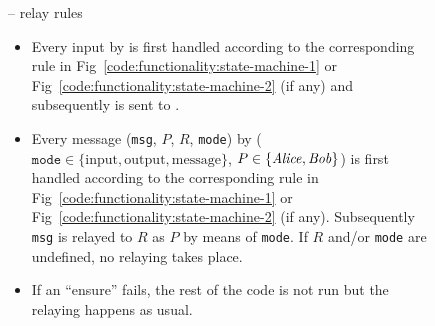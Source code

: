 
\begin{figure}[H]
  \begin{systembox}{\fchan -- relay rules}
    \begin{itemize}
      \item Every input by \environment is first handled according to the
      corresponding rule in Fig~\ref{code:functionality:state-machine-1} or
      Fig~\ref{code:functionality:state-machine-2} (if any) and subsequently is
      sent to \adversary.
      \item Every message (\texttt{msg}, $P$, $R$, \texttt{mode}) by \adversary
      ($\texttt{mode} \in \{\mathrm{input}, \mathrm{output},
      \mathrm{message}\}$, $P \in \{\mathit{Alice}, \mathit{Bob}\}$) is first handled according
      to the corresponding rule in Fig~\ref{code:functionality:state-machine-1}
      or Fig~\ref{code:functionality:state-machine-2} (if any).  Subsequently
      \texttt{msg} is relayed to $R$ as $P$ by means of \texttt{mode}. If $R$
      and/or \texttt{mode} are undefined, no relaying takes place.
      \item If an ``ensure'' fails, the rest of the code is not run but the
      relaying happens as usual.
    \end{itemize}
  \end{systembox}
  \caption{}
  \label{code:functionality:rules}
\end{figure}

